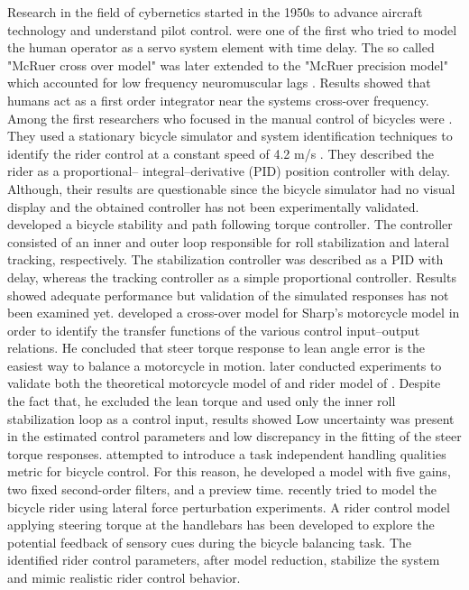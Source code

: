 Research in the field of cybernetics started in the 1950s to advance aircraft technology and understand pilot control. \citet{mcruer1959human} were one of the first who tried to model the human operator as a servo system element with  time delay. The so called "McRuer cross over model" was later extended to the "McRuer precision model" which accounted for low frequency neuromuscular lags \cite{mcruer1967manual}.  Results showed that humans act as a first order integrator near the systems cross-over frequency. Among the first researchers who focused in the manual control of bicycles were \citet{van1970influence}. They used a stationary bicycle simulator and system identification techniques to identify the rider control at a constant speed of 4.2 m/s . They described the rider as a proportional– integral–derivative (PID) position controller with delay. Although, their results are questionable since the bicycle simulator had no visual display and the obtained controller has not been experimentally validated. \citet{roland1971massing, roland1973computer} developed a bicycle stability and path following torque controller. The controller consisted of an inner and outer loop responsible for roll stabilization and lateral tracking, respectively. The stabilization controller was described as a PID with delay, whereas the tracking controller as a simple proportional controller. Results showed adequate performance but validation of the simulated responses has not been examined yet. \citet{weir1973manual} developed a cross-over model for Sharp's  \cite{sharp1971stability} motorcycle model in order to identify the transfer functions of the various control input–output relations. He concluded that steer torque response to lean angle error is the easiest way to balance a motorcycle in motion. \citet{eaton1975man} later conducted experiments to validate both the theoretical motorcycle model of  \citet{sharp1971stability} and rider model of \citet{weir1973manual} . Despite the fact that, he excluded the lean torque and used only the inner roll stabilization loop as a control input, results showed Low uncertainty was present in the estimated control parameters and low discrepancy in the fitting of the steer torque responses. \citet{hess2012modeling} attempted to introduce a task independent handling qualities metric for bicycle control. For this reason, he developed a model with five gains, two fixed second-order filters, and a preview time. \citet{schwab2013} recently tried to model the bicycle rider using lateral force perturbation experiments. A rider control model applying steering torque at the handlebars has been developed to explore the potential feedback of sensory cues during the bicycle balancing task. The identified rider control parameters, after model reduction, stabilize the system and mimic realistic rider control behavior.

